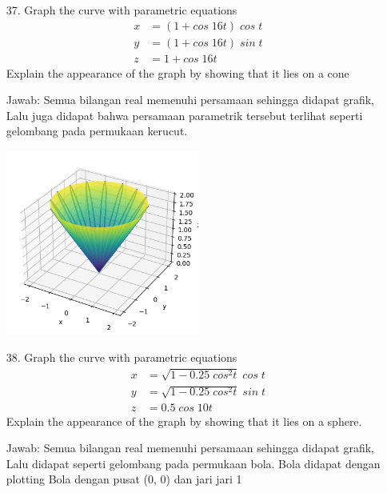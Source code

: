 \documentclass[twoside]{scrarticle}
\begin{document}
\begin{enumerate}
\item[37.] Graph the curve with parametric equations
\begin{equation*}
    \begin{aligned}
        x & = (1+cos\;16t)\;cos\;t\\
        y & = (1+cos\;16t)\;sin\;t\\
        z & = 1 + cos\;16t
    \end{aligned}
\end{equation*}
Explain the appearance of the graph by showing that it lies on a cone

Jawab: Semua bilangan real memenuhi persamaan sehingga didapat grafik, Lalu
juga didapat bahwa persamaan parametrik tersebut terlihat seperti 
gelombang pada permukaan kerucut.

\begin{minipage}{\linewidth}
    \includegraphics[width=0.5\textwidth]{37.png}
    \centering
\end{minipage}

\item[38.] Graph the curve with parametric equations
\begin{equation*}
    \begin{aligned}
        x & = \sqrt{1-0.25\;cos^2t}\;cos\;t\\
        y & = \sqrt{1-0.25\;cos^2t}\;sin\;t\\
        z & = 0.5\;cos\;10t
    \end{aligned}
\end{equation*}
Explain the appearance of the graph by showing that it lies on a sphere.

Jawab: Semua bilangan real memenuhi persamaan sehingga didapat grafik, 
Lalu didapat seperti gelombang pada permukaan bola. Bola didapat dengan plotting
Bola dengan pusat (0, 0) dan jari jari 1


\end{enumerate}
\end{document}
